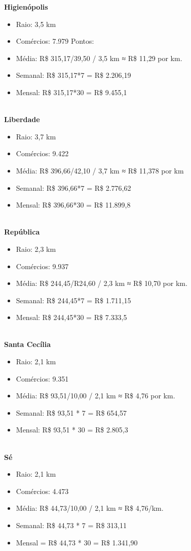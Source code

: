 \textbf{Higienópolis}
\begin{itemize}
    \item Raio: 3,5 km
    \item Comércios: 7.979 Pontos:
    \item Média: R\$ 315,17/39,50 / 3,5 km ≈ R\$ 11,29 por km.
    \item Semanal: R\$ 315,17*7 = R\$ 2.206,19
    \item Mensal: R\$ 315,17*30 = R\$ 9.455,1
\end{itemize}\\

\textbf{Liberdade}
\begin{itemize}
    \item Raio: 3,7 km
    \item Comércios: 9.422
    \item Média: R\$ 396,66/42,10 / 3,7 km ≈ R\$ 11,378 por km
    \item Semanal: R\$ 396,66*7 = R\$ 2.776,62
    \item Mensal: R\$ 396,66*30 = R\$ 11.899,8
\end{itemize}\\

\textbf{República}
\begin{itemize}
    \item Raio: 2,3 km
    \item Comércios: 9.937
    \item Média: R\$ 244,45/R24,60 / 2,3 km ≈ R\$ 10,70 por km.
    \item Semanal: R\$ 244,45*7 = R\$ 1.711,15
    \item Mensal: R\$ 244,45*30 = R\$ 7.333,5
\end{itemize}\\

\textbf{Santa Cecília}
\begin{itemize}
    \item Raio: 2,1 km
    \item Comércios: 9.351
    \item Média: R\$ 93,51/10,00 / 2,1 km ≈ R\$ 4,76 por km.
    \item Semanal: R\$ 93,51 * 7 = R\$ 654,57
    \item Mensal: R\$ 93,51 * 30 = R\$ 2.805,3
\end{itemize}\\

\textbf{Sé}
\begin{itemize}
    \item Raio: 2,1 km
    \item Comércios: 4.473
    \item Média: R\$ 44,73/10,00 / 2,1 km ≈ R\$ 4,76/km.
    \item Semanal: R\$ 44,73 * 7 = R\$ 313,11
    \item Mensal = R\$ 44,73 * 30 = R\$ 1.341,90
\end{itemize}


